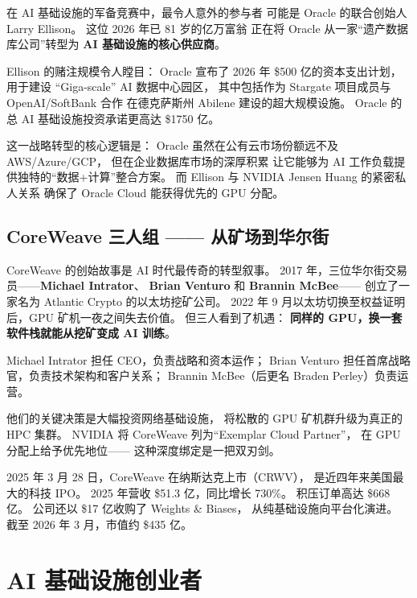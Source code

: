 在 AI 基础设施的军备竞赛中，最令人意外的参与者
可能是 Oracle 的联合创始人 Larry Ellison。
这位 2026 年已 81 岁的亿万富翁
正在将 Oracle 从一家``遗产数据库公司''转型为
\textbf{AI 基础设施的核心供应商}。

Ellison 的赌注规模令人瞠目：
Oracle 宣布了 2026 年 \$500 亿的资本支出计划，
用于建设 ``Giga-scale'' AI 数据中心园区，
其中包括作为 Stargate 项目成员与 OpenAI/SoftBank 合作
在德克萨斯州 Abilene 建设的超大规模设施。
Oracle 的总 AI 基础设施投资承诺更高达 \$1750 亿。

这一战略转型的核心逻辑是：
Oracle 虽然在公有云市场份额远不及 AWS/Azure/GCP，
但在企业数据库市场的深厚积累
让它能够为 AI 工作负载提供独特的``数据+计算''整合方案。
而 Ellison 与 NVIDIA Jensen Huang 的紧密私人关系
确保了 Oracle Cloud 能获得优先的 GPU 分配。

\subsection{CoreWeave 三人组 —— 从矿场到华尔街}
\label{subsec:coreweave}

CoreWeave 的创始故事是 AI 时代最传奇的转型叙事。
2017 年，三位华尔街交易员——\textbf{Michael Intrator}、
\textbf{Brian Venturo} 和 \textbf{Brannin McBee}——
创立了一家名为 Atlantic Crypto 的以太坊挖矿公司。
2022 年 9 月以太坊切换至权益证明后，GPU 矿机一夜之间失去价值。
但三人看到了机遇：
\textbf{同样的 GPU，换一套软件栈就能从挖矿变成 AI 训练}。

Michael Intrator 担任 CEO，负责战略和资本运作；
Brian Venturo 担任首席战略官，负责技术架构和客户关系；
Brannin McBee（后更名 Braden Perley）负责运营。

他们的关键决策是大幅投资网络基础设施，
将松散的 GPU 矿机群升级为真正的 HPC 集群。
NVIDIA 将 CoreWeave 列为``Exemplar Cloud Partner''，
在 GPU 分配上给予优先地位——
这种深度绑定是一把双刃剑。

2025 年 3 月 28 日，CoreWeave 在纳斯达克上市（CRWV），
是近四年来美国最大的科技 IPO。
2025 年营收 \$51.3 亿，同比增长 730\%。
积压订单高达 \$668 亿。
公司还以 \$17 亿收购了 Weights \& Biases，
从纯基础设施向平台化演进。
截至 2026 年 3 月，市值约 \$435 亿。

\section{AI 基础设施创业者}
\label{sec:infra-startups}

